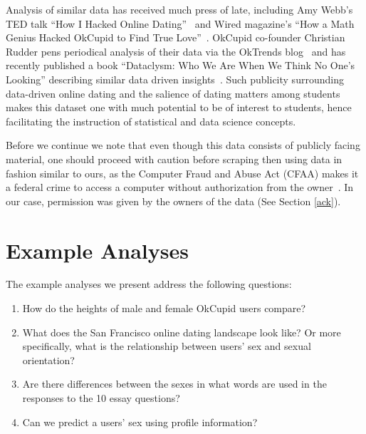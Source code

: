\documentclass{article}\usepackage[]{graphicx}\usepackage[]{color}
\begin{document}
Analysis of similar data has received much press of late, including Amy Webb's TED talk ``How I Hacked Online Dating''~\cite{TED} and Wired magazine's ``How a Math Genius Hacked OkCupid to Find True Love''~\cite{Wired}.  OkCupid co-founder Christian Rudder pens periodical analysis of their data via the OkTrends blog~\cite{OkTrends} and has recently published a book ``Dataclysm: Who We Are When We Think No One's Looking'' describing similar data driven insights~\cite{dataclysm}.  Such publicity surrounding data-driven online dating and the salience of dating matters among students makes this dataset one with much potential to be of interest to students, hence facilitating the instruction of statistical and data science concepts.

Before we continue we note that even though this data consists of publicly facing material, one should proceed with caution before scraping then using data in fashion similar to ours, as the Computer Fraud and Abuse Act (CFAA) makes it a federal crime to access a computer without authorization from the owner~\cite{pando}.  In our case, permission was given by the owners of the data (See Section \ref{ack}).










%
\section{Example Analyses}\label{analyses}
%
The example analyses we present address the following questions:

\begin{enumerate}
\item How do the heights of male and female OkCupid users compare?
\item What does the San Francisco online dating landscape look like?  Or more specifically, what is the relationship between users' sex and sexual orientation?
\item Are there differences between the sexes in what words are used in the responses to the 10 essay questions?
\item Can we predict a users' sex using profile information?
\end{enumerate}
\end{document}
